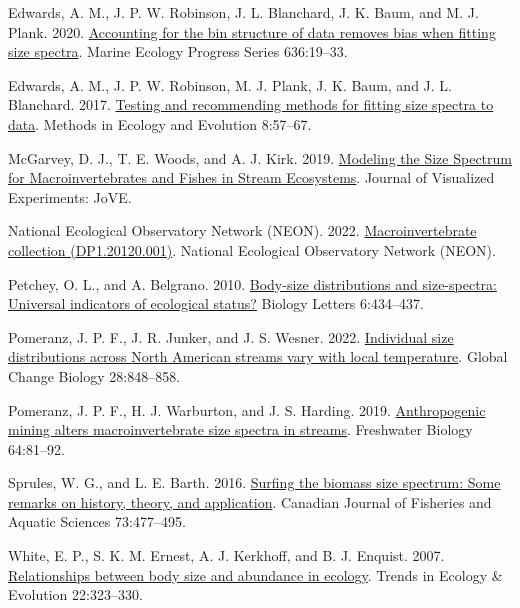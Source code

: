 \documentclass[
]{article}
\newlength{\cslhangindent}
\newlength{\cslentryspacingunit} %
\newenvironment{CSLReferences}[2] %
 {%
  \setlength{\parindent}{0pt}
  \ifodd #1
  \let\oldpar\par
  \def\par{\hangindent=\cslhangindent\oldpar}
  \fi
  \setlength{\parskip}{#2\cslentryspacingunit}
 }%
 {}
\begin{document}
\hypertarget{refs}{}
\begin{CSLReferences}{1}{0}
\leavevmode{}%
Edwards, A. M., J. P. W. Robinson, J. L. Blanchard, J. K. Baum, and M.
J. Plank. 2020. \href{https://doi.org/10.3354/meps13230}{Accounting for
the bin structure of data removes bias when fitting size spectra}.
Marine Ecology Progress Series 636:19--33.

\leavevmode{}%
Edwards, A. M., J. P. W. Robinson, M. J. Plank, J. K. Baum, and J. L.
Blanchard. 2017. \href{https://doi.org/10.1111/2041-210X.12641}{Testing
and recommending methods for fitting size spectra to data}. Methods in
Ecology and Evolution 8:57--67.

\leavevmode{}%
McGarvey, D. J., T. E. Woods, and A. J. Kirk. 2019.
\href{https://doi.org/10.3791/59945}{Modeling the {Size Spectrum} for
{Macroinvertebrates} and {Fishes} in {Stream Ecosystems}}. Journal of
Visualized Experiments: JoVE.

\leavevmode{}%
National Ecological Observatory Network (NEON). 2022.
\href{https://doi.org/10.48443/GN8X-K322}{Macroinvertebrate collection
({DP1}.20120.001)}. {National Ecological Observatory Network (NEON)}.

\leavevmode{}%
Petchey, O. L., and A. Belgrano. 2010.
\href{https://doi.org/10.1098/rsbl.2010.0240}{Body-size distributions
and size-spectra: Universal indicators of ecological status?} Biology
Letters 6:434--437.

\leavevmode{}%
Pomeranz, J. P. F., J. R. Junker, and J. S. Wesner. 2022.
\href{https://doi.org/10.1111/gcb.15862}{Individual size distributions
across {North American} streams vary with local temperature}. Global
Change Biology 28:848--858.

\leavevmode{}%
Pomeranz, J. P. F., H. J. Warburton, and J. S. Harding. 2019.
\href{https://doi.org/10.1111/fwb.13196}{Anthropogenic mining alters
macroinvertebrate size spectra in streams}. Freshwater Biology
64:81--92.

\leavevmode{}%
Sprules, W. G., and L. E. Barth. 2016.
\href{https://doi.org/10.1139/cjfas-2015-0115}{Surfing the biomass size
spectrum: Some remarks on history, theory, and application}. Canadian
Journal of Fisheries and Aquatic Sciences 73:477--495.

\leavevmode{}%
White, E. P., S. K. M. Ernest, A. J. Kerkhoff, and B. J. Enquist. 2007.
\href{https://doi.org/10.1016/j.tree.2007.03.007}{Relationships between
body size and abundance in ecology}. Trends in Ecology \& Evolution
22:323--330.

\end{CSLReferences}
\end{document}
